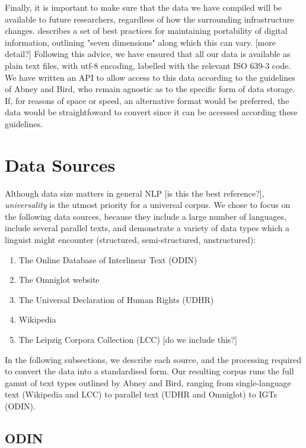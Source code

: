 \documentclass[11pt]{article}
\begin{document}
Finally, it is important to make sure that the data we have compiled will be available to future researchers, regardless of how the surrounding infrastructure changes.  describes a set of best practices for maintaining portability of digital information, outlining "seven dimensions" along which this can vary. [more detail?] Following this advice, we have ensured that all our data is available as plain text files, with utf-8 encoding, labelled with the relevant ISO 639-3 code. We have written an API to allow access to this data according to the guidelines of Abney and Bird, who remain agnostic as to the specific form of data storage. If, for reasons of space or speed, an alternative format would be preferred, the data would be straightfoward to convert since it can be accessed according these guidelines.


\section{Data Sources} \label{sec:sources}

Although data size matters in general NLP \cite{banko2001scaling} [is this the best reference?], \emph{universality} is the utmost priority for a universal corpus. We chose to focus on the following data sources, because they include a large number of languages, include several parallel texts, and demonstrate a variety of data types which a linguist might encounter (structured, semi-structured, unstructured):

\begin{enumerate}
\item The Online Database of Interlinear Text (ODIN)
\item The Omniglot website
\item The Universal Declaration of Human Rights (UDHR)
\item Wikipedia
\item The Leipzig Corpora Collection (LCC) [do we include this?]
\end{enumerate}

In the following subsections, we describe each source, and the processing required to convert the data into a standardised form. Our resulting corpus runs the full gamut of text types outlined by Abney and Bird, ranging from single-language text (Wikipedia and LCC) to parallel text (UDHR and Omniglot) to IGTs (ODIN).

\subsection{ODIN}
\end{document}
